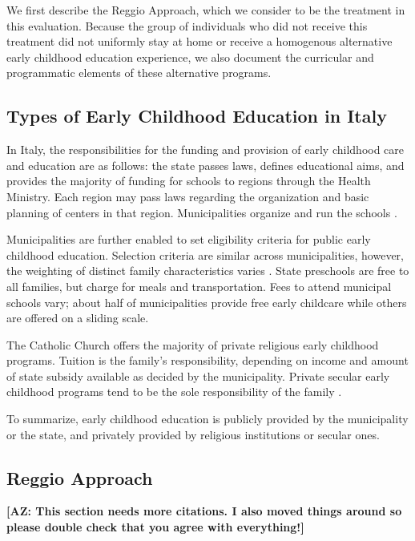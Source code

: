 We first describe the Reggio Approach, which we consider to be the treatment in this evaluation. Because the group of individuals who did not receive this treatment did not uniformly stay at home or receive a homogenous alternative early childhood education experience, we also document the curricular and programmatic elements of these alternative programs.

\subsection{Types of Early Childhood Education in Italy}

In Italy, the responsibilities for the funding and provision of early childhood care and education are as follows: the state passes laws, defines educational aims, and provides the majority of funding for schools to regions through the Health Ministry. Each region may pass laws regarding the organization and basic planning of centers in that region. Municipalities organize and run the schools \citep{Becchi-Ferrari_1990_Pub-Inf-Centres-Italy}. 

Municipalities are further enabled to set eligibility criteria for public early childhood education. Selection criteria are similar across municipalities, however, the weighting of distinct family characteristics varies \citep{Del-Boca-etal_2016_CESifo-ES}. State preschools are free to all families, but charge for meals and transportation. Fees to attend municipal schools vary; about half of municipalities provide free early childcare while others are offered on a sliding scale.

The Catholic Church offers the majority of private religious early childhood programs. Tuition is the family's responsibility, depending on income and amount of state subsidy available as decided by the municipality. Private secular early childhood programs tend to be the sole responsibility of the family \citep{Hohnerlein_2009_Paradox-Public-Preschools}.

To summarize, early childhood education is publicly provided by the municipality or the state, and privately provided by religious institutions or secular ones. 

\subsection{Reggio Approach}
\textbf{[AZ: This section needs more citations. I also moved things around so please double check that you agree with everything!]}

